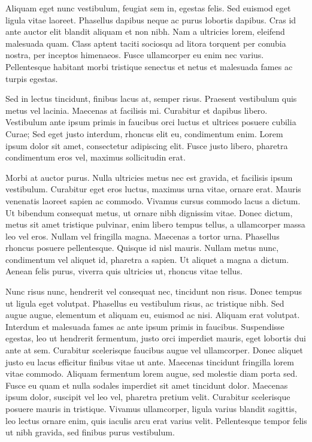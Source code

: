 Aliquam eget nunc vestibulum, feugiat sem in, egestas felis. Sed euismod eget ligula vitae laoreet. Phasellus dapibus neque ac purus lobortis dapibus. Cras id ante auctor elit blandit aliquam et non nibh. Nam a ultricies lorem, eleifend malesuada quam. Class aptent taciti sociosqu ad litora torquent per conubia nostra, per inceptos himenaeos. Fusce ullamcorper eu enim nec varius. Pellentesque habitant morbi tristique senectus et netus et malesuada fames ac turpis egestas.

Sed in lectus tincidunt, finibus lacus at, semper risus. Praesent vestibulum quis metus vel lacinia. Maecenas at facilisis mi. Curabitur et dapibus libero. Vestibulum ante ipsum primis in faucibus orci luctus et ultrices posuere cubilia Curae; Sed eget justo interdum, rhoncus elit eu, condimentum enim. Lorem ipsum dolor sit amet, consectetur adipiscing elit. Fusce justo libero, pharetra condimentum eros vel, maximus sollicitudin erat.

Morbi at auctor purus. Nulla ultricies metus nec est gravida, et facilisis ipsum vestibulum. Curabitur eget eros luctus, maximus urna vitae, ornare erat. Mauris venenatis laoreet sapien ac commodo. Vivamus cursus commodo lacus a dictum. Ut bibendum consequat metus, ut ornare nibh dignissim vitae. Donec dictum, metus sit amet tristique pulvinar, enim libero tempus tellus, a ullamcorper massa leo vel eros. Nullam vel fringilla magna. Maecenas a tortor urna. Phasellus rhoncus posuere pellentesque. Quisque id nisl mauris. Nullam metus nunc, condimentum vel aliquet id, pharetra a sapien. Ut aliquet a magna a dictum. Aenean felis purus, viverra quis ultricies ut, rhoncus vitae tellus.

Nunc risus nunc, hendrerit vel consequat nec, tincidunt non risus. Donec tempus ut ligula eget volutpat. Phasellus eu vestibulum risus, ac tristique nibh. Sed augue augue, elementum et aliquam eu, euismod ac nisi. Aliquam erat volutpat. Interdum et malesuada fames ac ante ipsum primis in faucibus. Suspendisse egestas, leo ut hendrerit fermentum, justo orci imperdiet mauris, eget lobortis dui ante at sem. Curabitur scelerisque faucibus augue vel ullamcorper. Donec aliquet justo eu lacus efficitur finibus vitae ut ante. Maecenas tincidunt fringilla lorem vitae commodo. Aliquam fermentum lorem augue, sed molestie diam porta sed. Fusce eu quam et nulla sodales imperdiet sit amet tincidunt dolor. Maecenas ipsum dolor, suscipit vel leo vel, pharetra pretium velit. Curabitur scelerisque posuere mauris in tristique. Vivamus ullamcorper, ligula varius blandit sagittis, leo lectus ornare enim, quis iaculis arcu erat varius velit. Pellentesque tempor felis ut nibh gravida, sed finibus purus vestibulum.

